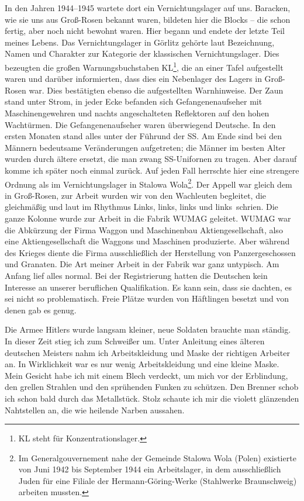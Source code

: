 \documentclass[a4paper,12pt,ngerman,
]{nisebook}
\begin{document}
In den Jahren 1944--1945 wartete dort ein Vernichtungslager auf uns. 
Baracken, wie sie uns aus Groß-Rosen bekannt waren, bildeten hier die Blocks -- die schon fertig, aber noch nicht bewohnt waren. Hier begann und endete der letzte Teil meines Lebens. Das Vernichtungslager in Görlitz gehörte laut Bezeichnung, Namen und Charakter zur Kategorie der klassischen Vernichtungslager. Dies bezeugten die großen Warnungsbuchstaben KL\footnote{KL steht für Konzentrationslager.}, die an einer Tafel aufgestellt waren und darüber informierten, dass dies ein Nebenlager des Lagers in Groß-Rosen war. Dies bestätigten ebenso die aufgestellten Warnhinweise. Der Zaun stand unter Strom, in jeder Ecke befanden sich Gefangenenaufseher mit Maschinengewehren und nachts angeschalteten Reflektoren auf den hohen Wachtürmen. Die Gefangenenaufseher waren überwiegend Deutsche. In den ersten Monaten stand alles unter der Führund der SS. Am Ende sind bei den Männern bedeutsame Veränderungen aufgetreten; die Männer im besten Alter wurden durch ältere ersetzt, die man zwang SS-Unifornen zu tragen. Aber darauf komme ich später noch einmal zurück. Auf jeden Fall herrschte hier eine strengere Ordnung als im Vernichtungslager in Stalowa Wola\footnote{Im Generalgouvernement nahe der Gemeinde Stalowa Wola (Polen) existierte von Juni 1942 bis September 1944 ein Arbeitslager, in dem ausschließlich Juden für eine Filiale der Hermann-Göring-Werke (Stahlwerke Braunschweig) arbeiten mussten.}. Der Appell war gleich dem in Groß-Rosen, zur Arbeit wurden wir von den Wachleuten begleitet, die gleichmäßig und laut im Rhythmus \glqq Links, links, links und links\grqq~schrien.
Die ganze Kolonne wurde zur Arbeit in die Fabrik WUMAG geleitet. WUMAG war die Abkürzung der Firma \glqq Waggon und Maschinenbau Aktiengesellschaft\grqq, also eine Aktiengesellschaft die Waggons und Maschinen produzierte. Aber während des Krieges diente die Firma ausschließlich der Herstellung von Panzergeschossen und Granaten. Die Art meiner Arbeit in der Fabrik war ganz untypisch. Am Anfang lief alles normal. Bei der Registrierung hatten die Deutschen kein Interesse an unserer beruflichen Qualifikation. Es kann sein, dass sie dachten, es sei nicht so problematisch. Freie Plätze wurden von Häftlingen besetzt und von denen gab es genug.

Die Armee Hitlers wurde langsam kleiner, neue Soldaten brauchte man ständig. 
In dieser Zeit stieg ich zum Schweißer um. Unter Anleitung eines älteren deutschen Meisters nahm ich Arbeitskleidung und Maske der richtigen Arbeiter an. In Wirklichkeit war es nur wenig Arbeitskleidung und eine kleine Maske. Mein Gesicht habe ich mit einem Blech verdeckt, um mich vor der Erblindung, den grellen Strahlen und den sprühenden Funken zu schützen. Den Brenner schob ich schon bald durch das Metallstück. Stolz schaute ich mir die violett glänzenden Nahtstellen an, die wie heilende Narben aussahen.
\end{document}
